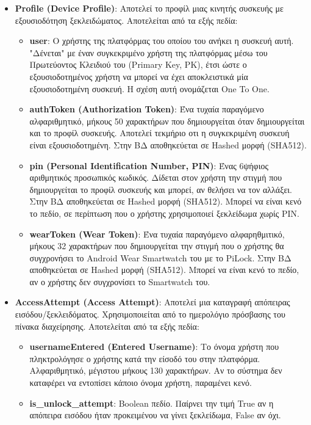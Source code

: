 	\begin{itemize}
		\item \textbf{Profile (Device Profile)}: Αποτελεί το προφίλ μιας κινητής συσκευής με εξουσιοδότηση ξεκλειδώματος. Αποτελείται από τα εξής πεδία:
		\begin{itemize}
			\item \textbf{user}: Ο χρήστης της πλατφόρμας του οποίου του ανήκει η συσκευή αυτή. "Δένεται" με έναν συγκεκριμένο χρήστη της πλατφόρμας μέσω του Πρωτεύοντος Κλειδιού του (Primary Key, PK), έτσι ώστε ο εξουσιοδοτημένος χρήστη να μπορεί να έχει αποκλειστικά μία εξουσιοδοτημένη συσκευή. Η σχέση αυτή ονομάζεται One To One.
			\item \textbf{authToken (Authorization Token)}: Ένα τυχαία παραγόμενο αλφαριθμητικό, μήκους 50 χαρακτήρων που δημιουργείται όταν δημιουργείται και το προφίλ συσκευής. Αποτελεί τεκμήριο οτι η συγκεκριμένη συσκευή είναι εξουσιοδοτημένη. Στην ΒΔ αποθηκεύεται σε Hashed μορφή (SHA512). 
			\item \textbf{pin (Personal Identification Number, PIN)}: Ένας 6ψήφιος αριθμητικός προσωπικός κωδικός. Δίδεται στον χρήστη την στιγμή που δημιουργείται το προφίλ συσκευής και μπορεί, αν θελήσει να τον αλλάξει. Στην ΒΔ αποθηκεύεται σε Hashed μορφή (SHA512). Μπορεί να είναι κενό το πεδίο, σε περίπτωση που ο χρήστης χρησιμοποιεί ξεκλείδωμα χωρίς PIN.
			\item \textbf{wearToken (Wear Token)}: Ένα τυχαία παραγόμενο αλφαρηθμιτικό, μήκους 32 χαρακτήρων που δημιουργείται την στιγμή που ο χρήστης θα συγχρονήσει το Android Wear Smartwatch του με το PiLock. Στην ΒΔ αποθηκεύεται σε Hashed μορφή (SHA512). Μπορεί να είναι κενό το πεδίο, αν ο χρήστης δεν συγχρονίσει το Smartwatch του.
		\end{itemize}
		\item \textbf{AccessAttempt (Access Attempt)}: Αποτελεί μια καταγραφή απόπειρας εισόδου/ξεκλειδόματος. Χρησιμοποιείται από το ημερολόγιο πρόσβασης του πίνακα διαχείρησης. Αποτελείται από τα εξής πεδία:
		\begin{itemize}
			\item \textbf{usernameEntered (Entered Username)}: Το όνομα χρήστη που πληκτρολόγησε ο χρήστης κατά την είσοδό του στην πλατφόρμα. Αλφαριθμητικό, μέγιστου μήκους 130 χαρακτήρων. Αν το σύστημα δεν καταφέρει να εντοπίσει κάποιο όνομα χρήστη, παραμένει κενό.
			\item \textbf{is\_unlock\_attempt}: Boolean πεδίο. Παίρνει την τιμή True αν η απόπειρα εισόδου ήταν προκειμένου να γίνει ξεκλείδωμα, False αν όχι.

\end{itemize}
\end{itemize}
